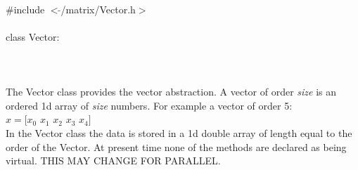 
   \\
\indent \#include $<\tilde{}$/matrix/Vector.h$>$  \\

  \\
\indent class Vector:  \\

 \\
 \\

  \\
\indent The Vector class provides the vector abstraction. A vector of
order {\em size} is an ordered 1d array of {\em size} numbers. For
example a vector of order 5: \\

\indent\indent $ x = [x_0$ $x_1$ $x_2$  $x_3$ $x_4]$ \\


In the Vector class the data is stored in a 1d double array of length
equal to the order of the Vector.  At present time none of the methods
are declared as being virtual. THIS MAY CHANGE FOR PARALLEL. \\

